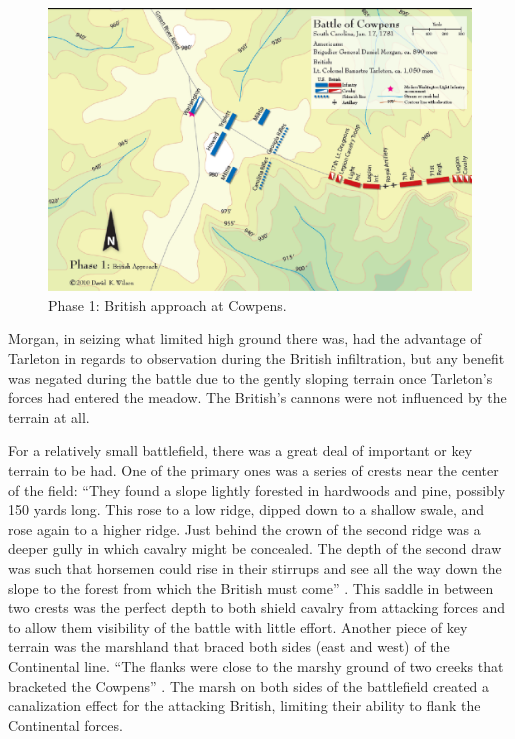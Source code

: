 \begin{figure}[ht]
    \begin{center}
    \includegraphics[width=\textwidth]{gfx/futch1}
    \end{center}
    \caption{Phase 1: British approach at Cowpens. \cite{wilson_blogmap}}
    \label{terrain1a}
\end{figure}

Morgan, in seizing what limited high ground there was, had the advantage of
Tarleton in regards to observation during the British infiltration, but any
benefit was negated during the battle due to the gently sloping terrain once
Tarleton’s forces had entered the meadow.  The British’s cannons were not
influenced by the terrain at all. 

For a relatively small battlefield, there was a great deal of important or key
terrain to be had.  One of the primary ones was a series of crests near the
center of the field: “They found a slope lightly forested in hardwoods and pine,
possibly 150 yards long. This rose to a low ridge, dipped down to a shallow
swale, and rose again to a higher ridge.  Just behind the crown of the second
ridge was a deeper gully in which cavalry might be concealed.  The depth of the
second draw was such that horsemen could rise in their stirrups and see all the
way down the slope to the forest from which the British must come”
\cite[126]{lumpkin_savannah_1981} \cite[126]{lumpkin_savannah_1981}.
This saddle in between two crests was the perfect depth to both shield
cavalry from attacking forces and to allow them visibility of the battle with
little effort. Another piece of key terrain was the marshland that braced both
sides (east and west) of the Continental line.  ``The flanks were close to the
marshy ground of two creeks that bracketed the Cowpens'' \cite[327]{stephenson_patriot_2007}.
The marsh on both sides of the battlefield created a canalization effect for the
attacking British, limiting their ability to flank the Continental forces.  


